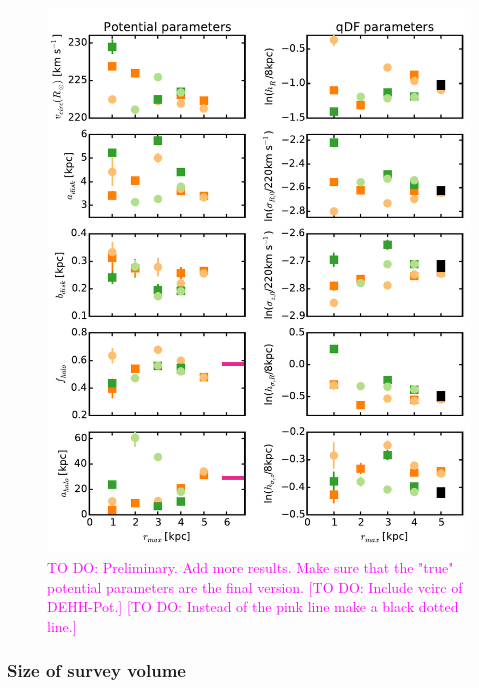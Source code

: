 \documentclass[iop,revtex4,numberedappendix,appendixfloats]{emulateapj}
\newcommand{\Wilma}[1]{\textcolor{Magenta}{#1}}
\begin{document}
\begin{figure}[!htbp]
\includegraphics[width=\columnwidth]{fig/MNdHHdiffSph2_violins.pdf}
\caption{\Wilma{TO DO: Preliminary. Add more results. Make sure that the "true" potential parameters are the final version.} \Wilma{[TO DO: Include vcirc of DEHH-Pot.]} \Wilma{[TO DO: Instead of the pink line make a black dotted line.]}}
\label{fig:model_parameters}
\end{figure}

\subsubsection{Size of survey volume}
\end{document}
